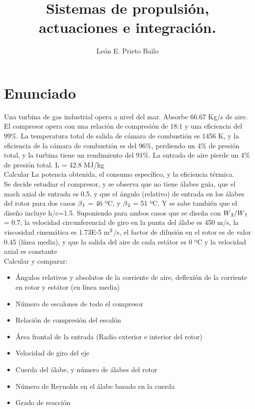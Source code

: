 \documentclass{report}
\title{Sistemas de propulsión, actuaciones e integración.}
\author{León E. Prieto Bailo}
\begin{document}
\maketitle


\section{Enunciado}

Una turbina de gas industrial opera a nivel del mar. Absorbe 66.67 Kg/s de aire. El compresor opera con una relación de compresión de 18:1 y una eficiencia del 99\%. La temperatura total de salida de cámara de combustión es 1456 K, y la eficiencia de la cámara de combustión es del 96\%, perdiendo un 4\% de presión total, y la turbina tiene un rendimiento del 91\%. La entrada de aire pierde un 4\% de presión total. L = 42.8 MJ/kg\\

Calcular La potencia obtenida, el consumo específico, y la eficiencia térmica.\\

Se decide estudiar el compresor, y se observa que no tiene álabes guía, que el mach axial de entrada es 0.5, y que el ángulo (relativo) de entrada en los álabes del rotor para dos casos $\beta\textsubscript{1}$ = 46 ºC, y $\beta\textsubscript{2}$ = 51 ºC. Y se sabe también que el diseño incluye h/c=1.5. Suponiendo para ambos casos que se diseña con $W\textsubscript{2}/W\textsubscript{1}$ = 0.7, la velocidad circunferencial de giro en la punta del álabe es 450 m/s, la viscosidad cinemática es 1.73E-5 m$\textsuperscript{2}$/s, el factor de difusión en el rotor es de valor 0.45 (línea media), y que la salida del aire de cada estátor es 0 ºC y la velocidad axial es constante\\

Calcular y comparar:\

\begin{itemize}
    \item Ángulos relativos y absolutos de la corriente de aire, deflexión de la corriente en rotor y estátor (en línea media)
    \item Número de escalones de todo el compresor
    \item Relación de compresión del escalón
    \item Área frontal de la entrada (Radio exterior e interior del rotor)
    \item Velocidad de giro del eje
    \item Cuerda del álabe, y número de álabes del rotor
    \item Número de Reynolds en el álabe basado en la cuerda
    \item Grado de reacción
\end{itemize}
\newpage
\end{document}
